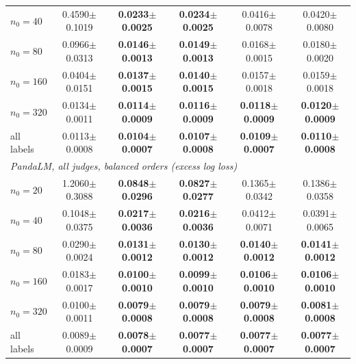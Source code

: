 \begin{table}[!t]
{\begin{tabular}{lccccc}
\quad $n_0=40$ & 0.4590{\scriptsize$\pm$0.1019} & \textbf{0.0233{\scriptsize$\pm$0.0025}} & \textbf{0.0234{\scriptsize$\pm$0.0025}} & 0.0416{\scriptsize$\pm$0.0078} & 0.0420{\scriptsize$\pm$0.0080} \\
\quad $n_0=80$ & 0.0966{\scriptsize$\pm$0.0313} & \textbf{0.0146{\scriptsize$\pm$0.0013}} & \textbf{0.0149{\scriptsize$\pm$0.0013}} & 0.0168{\scriptsize$\pm$0.0015} & 0.0180{\scriptsize$\pm$0.0020} \\
\quad $n_0=160$ & 0.0404{\scriptsize$\pm$0.0151} & \textbf{0.0137{\scriptsize$\pm$0.0015}} & \textbf{0.0140{\scriptsize$\pm$0.0015}} & 0.0157{\scriptsize$\pm$0.0018} & 0.0159{\scriptsize$\pm$0.0018} \\
\quad $n_0=320$ & 0.0134{\scriptsize$\pm$0.0011} & \textbf{0.0114{\scriptsize$\pm$0.0009}} & \textbf{0.0116{\scriptsize$\pm$0.0009}} & \textbf{0.0118{\scriptsize$\pm$0.0009}} & \textbf{0.0120{\scriptsize$\pm$0.0009}} \\
\quad all labels & 0.0113{\scriptsize$\pm$0.0008} & \textbf{0.0104{\scriptsize$\pm$0.0007}} & \textbf{0.0107{\scriptsize$\pm$0.0008}} & \textbf{0.0109{\scriptsize$\pm$0.0007}} & \textbf{0.0110{\scriptsize$\pm$0.0008}} \\
\midrule
\multicolumn{6}{l}{\emph{PandaLM, all judges, balanced orders (excess log loss)}} \\
\quad $n_0=20$ & 1.2060{\scriptsize$\pm$0.3088} & \textbf{0.0848{\scriptsize$\pm$0.0296}} & \textbf{0.0827{\scriptsize$\pm$0.0277}} & 0.1365{\scriptsize$\pm$0.0342} & 0.1386{\scriptsize$\pm$0.0358} \\
\quad $n_0=40$ & 0.1048{\scriptsize$\pm$0.0375} & \textbf{0.0217{\scriptsize$\pm$0.0036}} & \textbf{0.0216{\scriptsize$\pm$0.0036}} & 0.0412{\scriptsize$\pm$0.0071} & 0.0391{\scriptsize$\pm$0.0065} \\
\quad $n_0=80$ & 0.0290{\scriptsize$\pm$0.0024} & \textbf{0.0131{\scriptsize$\pm$0.0012}} & \textbf{0.0130{\scriptsize$\pm$0.0012}} & \textbf{0.0140{\scriptsize$\pm$0.0012}} & \textbf{0.0141{\scriptsize$\pm$0.0012}} \\
\quad $n_0=160$ & 0.0183{\scriptsize$\pm$0.0017} & \textbf{0.0100{\scriptsize$\pm$0.0010}} & \textbf{0.0099{\scriptsize$\pm$0.0010}} & \textbf{0.0106{\scriptsize$\pm$0.0010}} & \textbf{0.0106{\scriptsize$\pm$0.0010}} \\
\quad $n_0=320$ & 0.0100{\scriptsize$\pm$0.0011} & \textbf{0.0079{\scriptsize$\pm$0.0008}} & \textbf{0.0079{\scriptsize$\pm$0.0008}} & \textbf{0.0079{\scriptsize$\pm$0.0008}} & \textbf{0.0081{\scriptsize$\pm$0.0008}} \\
\quad all labels & 0.0089{\scriptsize$\pm$0.0009} & \textbf{0.0078{\scriptsize$\pm$0.0007}} & \textbf{0.0077{\scriptsize$\pm$0.0007}} & \textbf{0.0077{\scriptsize$\pm$0.0007}} & \textbf{0.0077{\scriptsize$\pm$0.0007}} \\
\bottomrule
\end{tabular}}
\end{table}
